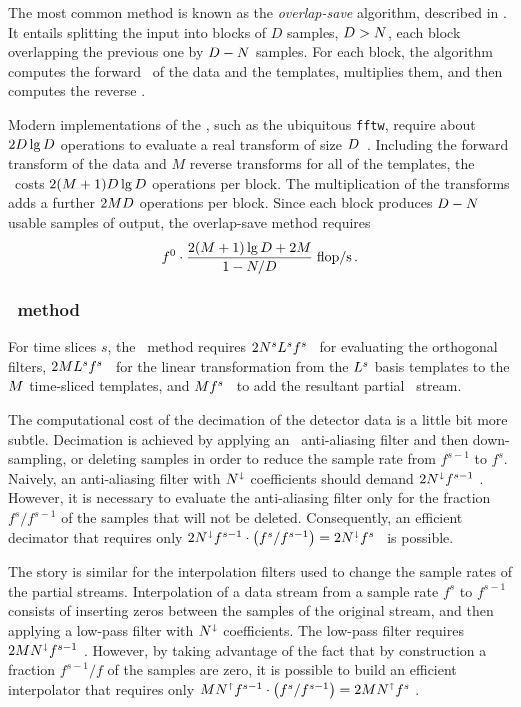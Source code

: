 The most common \FD{} method is known as the \emph{overlap-save} algorithm, described in \citet{numerical-recipes-chapter-13}.  It entails splitting the input into blocks of $D$ samples, $D > N$, each block overlapping the previous one by $D - N$ samples.  For each block, the algorithm computes the forward \fft\ of the data and the templates, multiplies them, and then computes the reverse \fft.

Modern implementations of the \fft, such as the ubiquitous \texttt{fftw}, require about $2 D \lg D$ operations to evaluate a real transform of size $D$~\citep{Johnson:2007p9654}.  Including the forward transform of the data and $M$ reverse transforms for all of the templates, the \fft\ costs $2 (M + 1) D \lg D$ operations per block.  The multiplication of the transforms adds a further $2 M D$ operations per block.  Since each block produces $D - N$ usable samples of output, the overlap-save method requires
$$
f^0 \cdot \frac{2 (M + 1) \lg D + 2 M}{1 - N/D} \; \mathrm{flop/s} \,.
$$

\subsubsection{\lloid\ method}

For time slices $s$, the \lloid\ method requires $2 N^s L^s f^s$ \flops\ 
for evaluating the orthogonal filters, $2 M L^s f^s$ \flops\ for the 
linear transformation from the $L^s$ basis templates to the $M$ time-sliced templates, and $M f^s$ \flops\ to add the resultant partial \SNR\ stream.

The computational cost of the decimation of the detector data is a little bit more subtle.  Decimation is achieved by applying an \fir\ anti-aliasing filter and then down-sampling, or deleting samples in order to reduce the sample rate from $f^{s-1}$ to $f^s$.  Naively, an anti-aliasing filter with $N^\shortdownarrow$ coefficients should demand $2 N^\shortdownarrow f^{s-1}$ \flops.  However, it is necessary to evaluate the anti-aliasing filter only for the fraction $f^s / f^{s-1}$ of the samples that will not be deleted.  Consequently, an efficient decimator that requires only $2 N^\shortdownarrow f^{s-1} \cdot \left( f^s / f^{s-1} \right) = 2 N^\shortdownarrow f^s$ \flops\ is possible.

The story is similar for the interpolation filters used to change the sample rates of the partial \SNR{} streams.  Interpolation of a data stream from a sample rate $f^s$ to $f^{s-1}$ consists of inserting zeros between the samples of the original stream, and then applying a low-pass filter with $N^\shortdownarrow$ coefficients.  The low-pass filter requires $2 M N^\shortdownarrow f^{s-1}$ \flops.  However, by taking advantage of the fact that by construction a fraction $f^{s-1}/f$ of the samples are zero, it is possible to build an efficient interpolator that requires only $M N^\shortuparrow f^{s-1} \cdot \left( f^s / f^{s-1} \right) = 2 M N^\shortuparrow f^s$ \flops.

